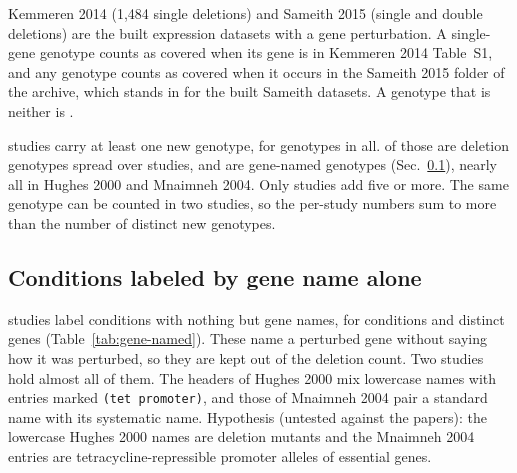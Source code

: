 Kemmeren 2014 (1,484 single deletions) and Sameith 2015 (single and double
deletions) are the built expression datasets with a gene perturbation. A
single-gene genotype counts as covered when its gene is in Kemmeren 2014
Table~S1, and any genotype counts as covered when it occurs in the Sameith 2015
folder of the archive, which stands in for the built Sameith datasets. A
genotype that is neither is .

\spellNNewStudies{} studies carry at least one new genotype, for
\spellNNewGenotypes{} genotypes in all. \spellNNewKoGenotypes{} of those are
deletion genotypes spread over \spellNNewKoStudies{} studies, and
\spellNNewNamedGenotypes{} are gene-named genotypes
(Sec.~\ref{sec:gene-named}), nearly all in Hughes 2000 and Mnaimneh 2004. Only
\spellNNewStudiesFivePlus{} studies add five or more. The same genotype can be
counted in two studies, so the per-study numbers sum to more than the number of
distinct new genotypes.



\subsection{Conditions labeled by gene name alone}\label{sec:gene-named}

\spellNNamedStudies{} studies label conditions with nothing but gene names, for
\spellNNamedConditions{} conditions and \spellNNamedGenes{} distinct genes
(Table~\ref{tab:gene-named}). These name a perturbed gene without saying how it
was perturbed, so they are kept out of the deletion count. Two studies hold
almost all of them. The headers of Hughes 2000 mix lowercase names with entries
marked \texttt{(tet promoter)}, and those of Mnaimneh 2004 pair a standard name
with its systematic name. Hypothesis (untested against the papers): the
lowercase Hughes 2000 names are deletion mutants and the Mnaimneh 2004 entries
are tetracycline-repressible promoter alleles of essential genes.


